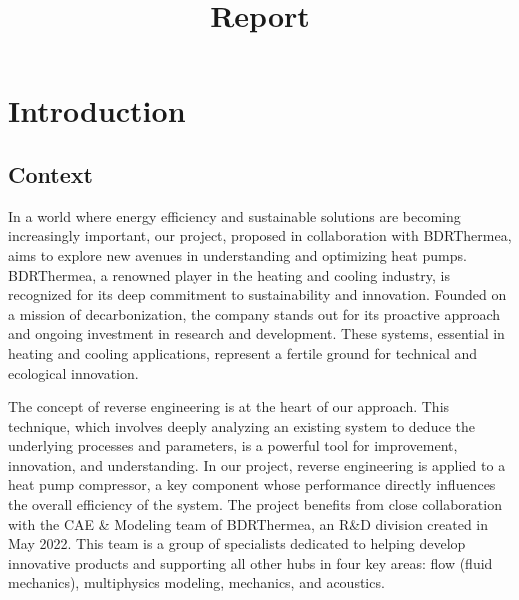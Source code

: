 \documentclass{report}
\title{Report} %
\begin{document}



        
\fairemarges%
\fairepagedegarde%
\tabledesmatieres%



\section{Introduction} 

\subsection{Context}

In a world where energy efficiency and sustainable solutions are becoming increasingly important, our project, proposed in collaboration with BDRThermea, aims to explore new avenues in understanding and optimizing heat pumps. BDRThermea, a renowned player in the heating and cooling industry, is recognized for its deep commitment to sustainability and innovation. Founded on a mission of decarbonization, the company stands out for its proactive approach and ongoing investment in research and development. These systems, essential in heating and cooling applications, represent a fertile ground for technical and ecological innovation.

The concept of reverse engineering is at the heart of our approach. This technique, which involves deeply analyzing an existing system to deduce the underlying processes and parameters, is a powerful tool for improvement, innovation, and understanding. In our project, reverse engineering is applied to a heat pump compressor, a key component whose performance directly influences the overall efficiency of the system. The project benefits from close collaboration with the CAE \& Modeling team of BDRThermea, an R\&D division created in May 2022. This team is a group of specialists dedicated to helping develop innovative products and supporting all other hubs in four key areas: flow (fluid mechanics), multiphysics modeling, mechanics, and acoustics.
\end{document}
